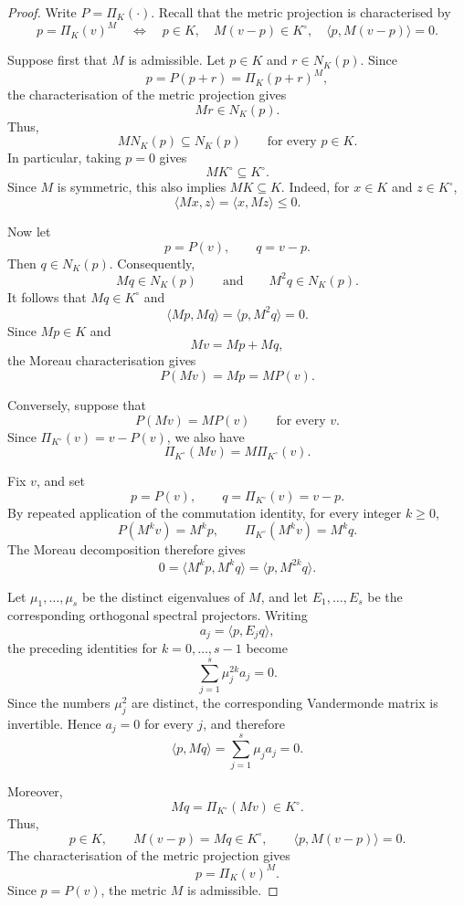 \documentclass[a4paper,11pt]{book}
\theoremstyle{plain}
\theoremstyle{definition}
\theoremstyle{remark}
\numberwithin{equation}{chapter}
\numberwithin{algorithm}{chapter}
\newcommand{\proj}[2]{\Pi_{#2}\!\left(#1\right)}
\begin{document}
	\begin{proof}
		Write $P=\proj{\cdot}{K}$. Recall that the metric projection is characterised
		by
		\[
		p=\proj{v}{K}^{M}
		\quad\Longleftrightarrow\quad
		p\in K,\quad M(v-p)\in K^\circ,\quad
		\langle p,M(v-p)\rangle=0.
		\]
		
		Suppose first that $M$ is admissible. Let $p\in K$ and
		$r\in N_K(p)$. Since
		\[
		p=P(p+r)=\proj{p+r}{K}^{M},
		\]
		the characterisation of the metric projection gives
		\[
		Mr\in N_K(p).
		\]
		Thus,
		\[
		M N_K(p)\subseteq N_K(p)
		\qquad\text{for every }p\in K.
		\]
		In particular, taking $p=0$ gives
		\[
		MK^\circ\subseteq K^\circ.
		\]
		Since $M$ is symmetric, this also implies $MK\subseteq K$. Indeed, for
		$x\in K$ and $z\in K^\circ$,
		\[
		\langle Mx,z\rangle=\langle x,Mz\rangle\leq0.
		\]
		
		Now let
		\[
		p=P(v),
		\qquad
		q=v-p.
		\]
		Then $q\in N_K(p)$. Consequently,
		\[
		Mq\in N_K(p)
		\qquad\text{and}\qquad
		M^2q\in N_K(p).
		\]
		It follows that $Mq\in K^\circ$ and
		\[
		\langle Mp,Mq\rangle
		=
		\langle p,M^2q\rangle
		=
		0.
		\]
		Since $Mp\in K$ and
		\[
		Mv=Mp+Mq,
		\]
		the Moreau characterisation gives
		\[
		P(Mv)=Mp=MP(v).
		\]
		
		Conversely, suppose that
		\[
		P(Mv)=MP(v)
		\qquad\text{for every }v.
		\]
		Since $\proj{v}{K^\circ}=v-P(v)$, we also have
		\[
		\proj{Mv}{K^\circ}
		=
		M\proj{v}{K^\circ}.
		\]
		
		Fix $v$, and set
		\[
		p=P(v),
		\qquad
		q=\proj{v}{K^\circ}=v-p.
		\]
		By repeated application of the commutation identity, for every integer
		$k\geq0$,
		\[
		P(M^kv)=M^kp,
		\qquad
		\proj{M^kv}{K^\circ}=M^kq.
		\]
		The Moreau decomposition therefore gives
		\[
		0
		=
		\langle M^kp,M^kq\rangle
		=
		\langle p,M^{2k}q\rangle.
		\]
		
		Let $\mu_1,\dots,\mu_s$ be the distinct eigenvalues of $M$, and let
		$E_1,\dots,E_s$ be the corresponding orthogonal spectral projectors. Writing
		\[
		a_j=\langle p,E_jq\rangle,
		\]
		the preceding identities for $k=0,\dots,s-1$ become
		\[
		\sum_{j=1}^s\mu_j^{2k}a_j=0.
		\]
		Since the numbers $\mu_j^2$ are distinct, the corresponding Vandermonde matrix
		is invertible. Hence $a_j=0$ for every $j$, and therefore
		\[
		\langle p,Mq\rangle
		=
		\sum_{j=1}^s\mu_j a_j
		=
		0.
		\]
		
		Moreover,
		\[
		Mq=\proj{Mv}{K^\circ}\in K^\circ.
		\]
		Thus,
		\[
		p\in K,\qquad M(v-p)=Mq\in K^\circ,\qquad
		\langle p,M(v-p)\rangle=0.
		\]
		The characterisation of the metric projection gives
		\[
		p=\proj{v}{K}^{M}.
		\]
		Since $p=P(v)$, the metric $M$ is admissible.
	\end{proof}
	
\end{document}
